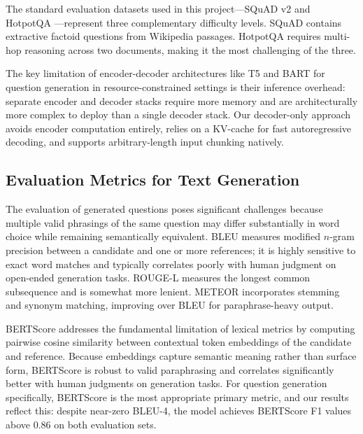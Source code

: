 \documentclass[12pt]{article}
\begin{document}
The standard evaluation datasets used in this project---SQuAD v2 \citep{rajpurkar2016squad} and HotpotQA \citep{yang2018hotpotqa}---represent three complementary difficulty levels. SQuAD contains extractive factoid questions from Wikipedia passages. HotpotQA requires multi-hop reasoning across two documents, making it the most challenging of the three.

The key limitation of encoder-decoder architectures like T5 and BART for question generation in resource-constrained settings is their inference overhead: separate encoder and decoder stacks require more memory and are architecturally more complex to deploy than a single decoder stack. Our decoder-only approach avoids encoder computation entirely, relies on a KV-cache for fast autoregressive decoding, and supports arbitrary-length input chunking natively.

\subsection{Evaluation Metrics for Text Generation}

The evaluation of generated questions poses significant challenges because multiple valid phrasings of the same question may differ substantially in word choice while remaining semantically equivalent. BLEU \citep{papineni2002bleu} measures modified $n$-gram precision between a candidate and one or more references; it is highly sensitive to exact word matches and typically correlates poorly with human judgment on open-ended generation tasks. ROUGE-L \citep{lin2004rouge} measures the longest common subsequence and is somewhat more lenient. METEOR \citep{banerjee2005meteor} incorporates stemming and synonym matching, improving over BLEU for paraphrase-heavy output.

BERTScore \citep{zhang2020bertscore} addresses the fundamental limitation of lexical metrics by computing pairwise cosine similarity between contextual token embeddings of the candidate and reference. Because embeddings capture semantic meaning rather than surface form, BERTScore is robust to valid paraphrasing and correlates significantly better with human judgments on generation tasks. For question generation specifically, BERTScore is the most appropriate primary metric, and our results reflect this: despite near-zero BLEU-4, the model achieves BERTScore F1 values above 0.86 on both evaluation sets.

\end{document}
